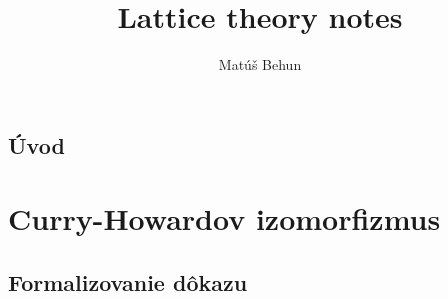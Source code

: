\documentclass[a4paper,10pt,oneside]{report}%
\author{Mat\'u\v{s} Behun}
\title{Lattice theory notes}
\begin{document}
\tableofcontents

\section{Úvod}





\chapter{Curry-Howardov izomorfizmus}
\section{Formalizovanie dôkazu}
\end{document}
